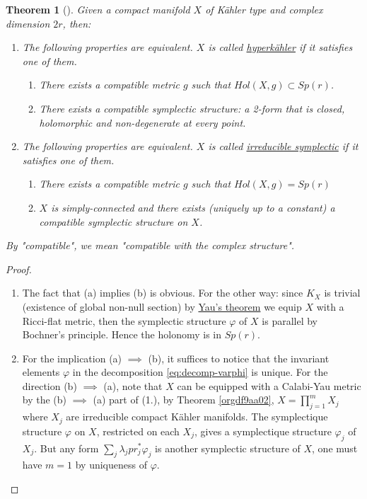 \documentclass[11pt]{article}
\newtheorem{theorem}{Theorem}
\begin{document}
\begin{theorem}[]
\label{thm:Sp-alg}
\label{org84293a6}
Given a compact manifold \(X\) of Kähler type and complex dimension \(2r\), then:
\begin{enumerate}
\item The following properties are equivalent. \(X\) is called \uline{hyperkähler} if it
satisfies one of them.
\begin{enumerate}
\item There exists a compatible metric \(g\) such that \(Hol(X,g) \subset Sp(r)\).
\item There exists a compatible symplectic structure: a 2-form that is closed, holomorphic and non-degenerate
at every point.
\end{enumerate}
\item The following properties are equivalent. \(X\) is called \uline{irreducible symplectic} if it
satisfies one of them.
\begin{enumerate}
\item There exists a compatible metric \(g\) such that \(Hol(X,g) = Sp(r)\)
\item \(X\) is simply-connected and there exists (uniquely up to a constant) a compatible symplectic structure on
\(X\).
\end{enumerate}
\end{enumerate}
By "compatible", we mean "compatible with the complex structure".
\end{theorem}

\begin{proof}
\begin{enumerate}
\item The fact that (a) implies (b) is obvious. For the other way: since \(K_X\) is trivial (existence of
global non-null section) by \href{calabi-yau.org}{Yau's theorem} we equip \(X\) with a Ricci-flat metric, then the
symplectic structure \(\varphi\) of \(X\) is parallel by Bochner's principle. Hence the holonomy is
in \(Sp(r)\).
\item For the implication (a) \(\implies\) (b), it suffices to notice that the invariant elements \(\varphi\)
in the decomposition \eqref{eq:decomp-varphi} is unique. For the direction (b) \(\implies\) (a),
note that \(X\) can be equipped with a Calabi-Yau metric by the (b) \(\implies\) (a) part of (1.), by
Theorem \ref{orgdf9aa02}, \(X = \prod_{j=1}^m X_j\) where \(X_j\) are irreducible compact Kähler
manifolds. The symplectique structure \(\varphi\) on \(X\), restricted on each \(X_j\), gives a
symplectique structure \(\varphi_j\) of \(X_j\). But any form \(\sum_j \lambda_j pr_j^*\varphi_j\) is
another symplectic structure of \(X\), one must have \(m=1\) by uniqueness of \(\varphi\).
\end{enumerate}
\end{proof}
\end{document}
